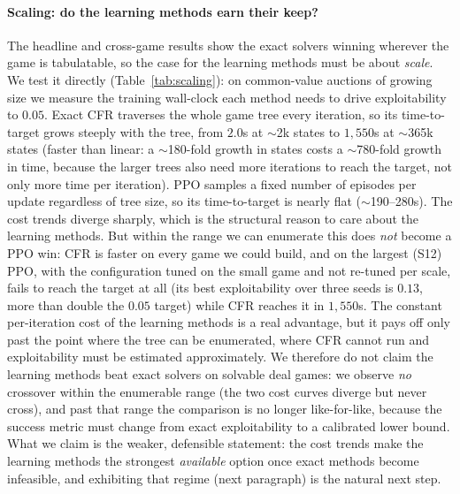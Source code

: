 \documentclass[11pt,a4paper]{article}
\begin{document}
\paragraph{Scaling: do the learning methods earn their keep?}
\label{sec:scaling}
The headline and cross-game results show the exact solvers winning wherever the game
is tabulatable, so the case for the learning methods must be about \emph{scale}. We
test it directly (Table~\ref{tab:scaling}): on common-value auctions of growing size
we measure the training wall-clock each method needs to drive exploitability to
$0.05$. Exact CFR traverses the whole game tree every iteration, so its time-to-target
grows steeply with the tree, from $2.0$s at $\sim$2k states to $1{,}550$s at
$\sim$365k states (faster than linear: a $\sim$180-fold growth in states costs a
$\sim$780-fold growth in time, because the larger trees also need more iterations to
reach the target, not only more time per iteration). PPO samples a fixed number of
episodes per update regardless of tree size, so its time-to-target is nearly flat
($\sim$190--280s). The cost trends diverge sharply, which is the structural reason to
care about the learning methods. But within the range we can enumerate this does
\emph{not} become a PPO win: CFR is faster on every game we could build, and on the
largest (S12) PPO, with the configuration tuned on the small game and not re-tuned
per scale, fails to reach the target at all (its best exploitability over three seeds
is $0.13$, more than double the $0.05$ target) while CFR reaches it in $1{,}550$s. The
constant per-iteration cost of the learning methods is a real advantage, but it pays
off only past the point where the tree can be enumerated, where CFR cannot run and
exploitability must be estimated approximately. We therefore do not claim the
learning methods beat exact solvers on solvable deal games: we observe \emph{no}
crossover within the enumerable range (the two cost curves diverge but never cross),
and past that range the comparison is no longer like-for-like, because the success
metric must change from exact exploitability to a calibrated lower bound. What we claim
is the weaker, defensible statement: the cost trends make the learning methods the
strongest \emph{available} option once exact methods become infeasible, and exhibiting
that regime (next paragraph) is the natural next step.
\end{document}
